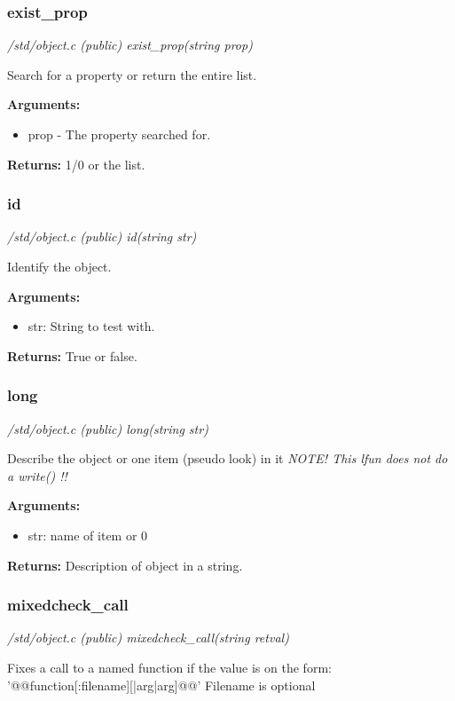 \subsubsection{exist\_prop}

{\em /std/object.c (public) exist\_prop(string prop)}

Search for a property or return the entire list.

{\bf Arguments:}
\begin{itemize}
\item     prop - The property searched for.
\end{itemize}

{\bf Returns:}        1/0 or the list.


\subsubsection{id}

{\em /std/object.c (public) id(string str)}

Identify the object.

{\bf Arguments:}
\begin{itemize}
\item     str: String to test with.
\end{itemize}

{\bf Returns:}    True or false.


\subsubsection{long}

{\em /std/object.c (public) long(string str)}

Describe the object or one item (pseudo look) in it
{\em NOTE! This lfun does not do a write() !!}

{\bf Arguments:}
\begin{itemize}
\item     str: name of item or 0
\end{itemize}

{\bf Returns:}    Description of object in a string.


\subsubsection{mixedcheck\_call}

{\em /std/object.c (public) mixedcheck\_call(string retval)}

Fixes a call to a named function if the value is on the form:
'@@function[:filename][|arg|arg]@@' Filename is optional

